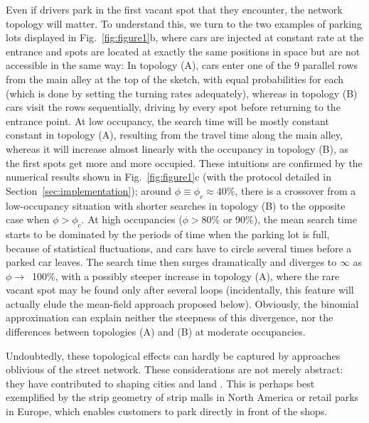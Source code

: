 \documentclass[trsc,reprint]{informs3}
\newcommand{\AN}[1]{#1}
\begin{document}
Even if drivers park in the first vacant spot that they encounter, the network topology will matter. To understand this, we turn to the two examples of parking lots displayed
in Fig.~\ref{fig:figure1}b, where cars are injected at constant rate at the entrance and spots
are located at exactly the same positions in space but are not accessible in the same way: 
In topology (A), cars enter one of the 9 parallel rows from the main alley at the top of the sketch, with equal probabilities for each (which is done by setting the turning rates adequately),
whereas in topology (B) cars visit the rows sequentially, driving by every spot before
returning to the entrance point.
At low occupancy, the search time will be mostly constant constant in topology (A), resulting from the travel time along the main alley, 
whereas it will increase almost linearly with the occupancy in topology (B), as the first spots
get more and more occupied. These intuitions are confirmed by the numerical results shown in Fig.~\ref{fig:figure1}c (with the protocol detailed in Section~\ref{sec:implementation}); 
\AN{around $\phi\equiv \phi_c\approx 40\%$, there is a crossover}
from a low-occupancy situation with shorter searches in topology (B) to the opposite case when $\phi>\phi_c$. At high occupancies ($\phi>$80\% or 90\%), the mean search time starts to be dominated by the periods of time when the parking lot is full, because of statistical fluctuations, and cars have to circle several times before a parked car leaves. The search time then surges dramatically and diverges to $\infty$ as $\phi \to$~100\%, with a possibly steeper increase in topology (A), where the rare vacant spot may
be found only after several loops
\AN{(incidentally, this feature will actually elude the mean-field approach proposed below).}
Obviously, the binomial approximation can explain neither
the steepness of this divergence, nor 
the differences between topologies (A) and (B) at moderate occupancies.





\AN{Undoubtedly,} these topological effects can hardly be captured by approaches oblivious of the street network. These considerations \AN{are not} merely abstract: they have contributed to shaping cities and land \citep[intro.]{shoup2018parking}. This is perhaps best exemplified by the strip geometry of strip malls in North America or retail parks in Europe, which enables customers to park directly in front of the shops. 
\end{document}
